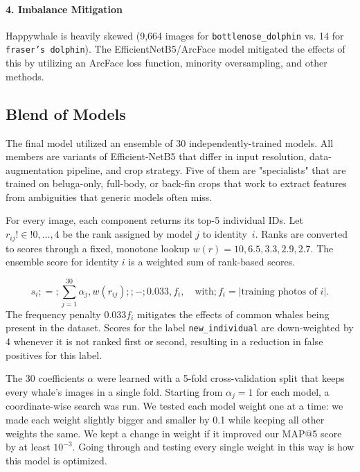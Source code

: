 \documentclass[twocolumn]{article}
\begin{document}
\paragraph{4. Imbalance Mitigation}

Happywhale is heavily skewed (9,664 images for \texttt{bottlenose_dolphin} vs. 14 for \texttt{fraser's dolphin}). The EfficientNetB5/ArcFace model mitigated the effects of this by utilizing an ArcFace loss function, minority oversampling, and other methods. 

\subsection{Blend of Models}

The final model utilized an ensemble of 30 independently-trained models. All members are variants of Efficient-NetB5 that differ in input resolution, data-augmentation pipeline, and crop strategy. Five of them are "specialists" that are trained on beluga-only, full-body, or back-fin crops that work to extract features from ambiguities that generic models often miss.

For every image, each component returns its top-5 individual IDs. Let $r_{ij}!\in!{0,\dots,4}$ be the rank assigned by model $j$ to identity~$i$. Ranks are converted to scores through a fixed, monotone lookup $w(r)={10,6.5,3.3,2.9,2.7}$. The ensemble score for identity $i$ is a weighted sum of rank-based scores.

\begin{equation}
s_i;=;\sum_{j=1}^{30} \alpha_j,w(r_{ij});;{-};0.033,f_i,\quad\text{with};f_i=|{\text{training photos of }i}|.
\end{equation}
The frequency penalty $0.033 f_i$ mitigates the effects of common whales being present in the dataset. Scores for the label \texttt{new_individual} are down-weighted by 4 whenever it is not ranked first or second, resulting in a reduction in false positives for this label. 

The 30 coefficients ${\alpha}$ were learned with a 5-fold cross-validation split that keeps every whale's images in a single fold. Starting from $\alpha_j = 1$ for each model, a coordinate-wise search was run. We tested each model weight one at a time: we made each weight slightly bigger and smaller by 0.1 while keeping all other weights the same. We kept a change in weight if it improved our MAP@5 score by at least $10^{-3}$. Going through and testing every single weight in this way is how this model is optimized.
\end{document}
